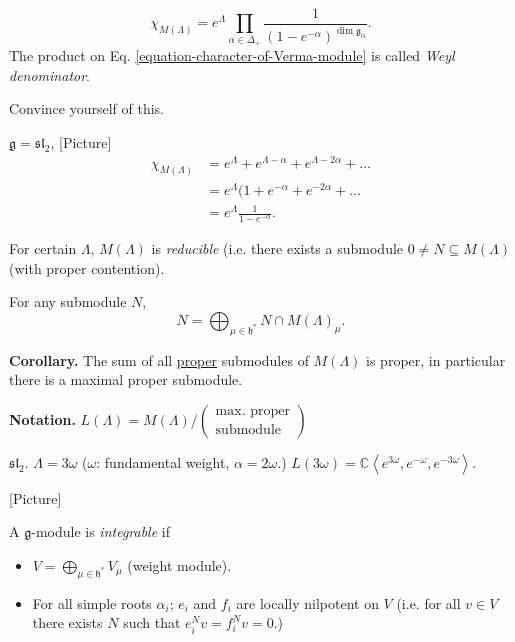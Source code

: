 \begin{equation}
\label{equation-character-of-Verma-module}
\chi_{M(\Lambda)}=e^{\Lambda}\prod_{\alpha \in \Delta_+}
\frac{1}{(1-e^{-\alpha})^{\dim \mathfrak{g}_\alpha}}.
\end{equation}
The product on Eq. \ref{equation-character-of-Verma-module} is called 
{\it Weyl denominator}.
\begin{exercise}
\label{exercise-convince-yourself}
Convince yourself of this.
\end{exercise}

\begin{example}
\label{example-sl2-character}
$\mathfrak{g}=\mathfrak{sl}_2$, [Picture]
\begin{align*}
\chi_{M(\Lambda)}&=e^{\Lambda}+e^{\Lambda-\alpha}+e^{\Lambda-2\alpha}+\ldots\\
&=e^{\Lambda}(1+e^{-\alpha}+e^{-2\alpha}+\ldots\\
&=e^{\Lambda}\frac{1}{1-e^{-\alpha}}.
\end{align*}
\end{example}

\medskip\noindent
For certain $\Lambda$, $M(\Lambda)$ is {\it reducible} (i.e. there exists
a submodule $0 \neq N \subseteq M(\Lambda)$ (with proper contention).

\begin{lemma}
\label{lemma-}
For any submodule $N$,
$$
N=\bigoplus_{\mu \in \mathfrak{h}^*}N \cap M(\Lambda)_\mu.
$$
\end{lemma}

{\bf Corollary.} The sum of all  \underline{proper} submodules 
of  $M(\Lambda)$ is proper, in particular
there is a maximal proper submodule.

{\bf Notation.} $L(\Lambda)=M(\Lambda)\Big/\left(\substack{
\text{max. proper} \\ \text{submodule}}\right)$

\begin{example}
\label{example-}
$\mathfrak{sl}_2$. $\Lambda=3\omega$ ($\omega$: fundamental weight,
$\alpha=2\omega$.) 
$L(3\omega)=\mathbb{C}\left<e^{3\omega},e^{-\omega},e^{-3\omega}\right>$.

[Picture]
\end{example}

\begin{definition}
\label{definition-integrable-g-module}
A $\mathfrak{g}$-module is {\it integrable} if
\begin{itemize}
\item $V=\bigoplus_{\mu \in \mathfrak{h}^*}V_\mu$ (weight module).
\item For all simple roots $\alpha_i$; $e_i$ and $f_i$ are
locally nilpotent on $V$ (i.e. for all $v \in V$
there exists $N$ such that
$e_i^Nv=f_i^Nv=0$.)
\end{itemize}
\end{definition}

